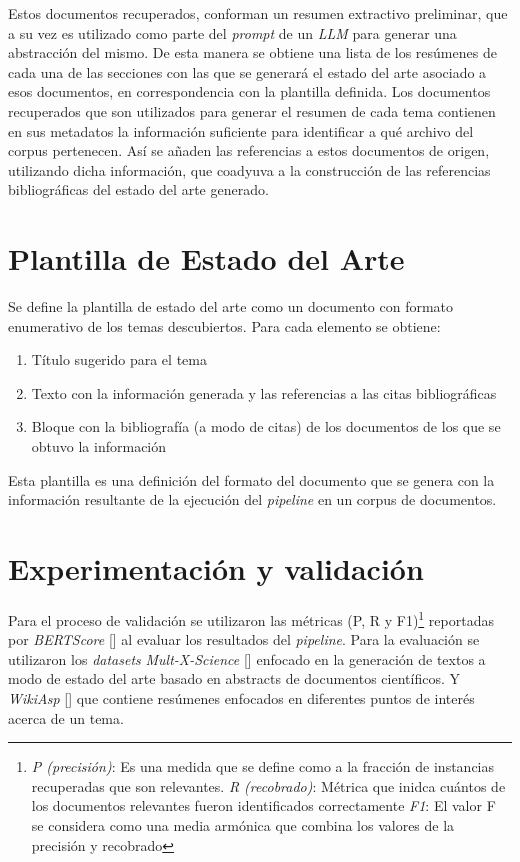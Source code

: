    Estos documentos recuperados, conforman un resumen extractivo preliminar, que a su vez es utilizado como parte del \emph{prompt} de un \emph{LLM} para generar una abstracción del mismo. De esta manera se obtiene una lista de los resúmenes de cada una de las secciones con las que se generará el estado del arte asociado a esos documentos, en correspondencia con la plantilla definida.
    Los documentos recuperados que son utilizados para generar el resumen de cada tema contienen en sus metadatos la información suficiente para identificar a qué archivo del corpus pertenecen. Así se añaden las referencias a estos documentos de origen, utilizando dicha información, que coadyuva a la construcción de las referencias bibliográficas del estado del arte generado.


\section{Plantilla de Estado del Arte}
Se define la plantilla de estado del arte como un documento con formato enumerativo de los temas descubiertos. Para cada elemento se obtiene:
\begin{enumerate}
    \item Título sugerido para el tema
    \item Texto con la información generada y las referencias a las citas bibliográficas
    \item Bloque con la bibliografía (a modo de citas) de los documentos de los que se obtuvo la información
\end{enumerate}

Esta plantilla es una definición del formato del documento que se genera con la información resultante de la ejecución del \emph{pipeline} en un corpus de documentos.

\section{Experimentación y validación}
Para el proceso de validación se utilizaron las m\'etricas (P, R y F1)\footnote{\emph{P (precisión)}: Es una medida que se define como a la fracción de instancias recuperadas que son relevantes. \emph{R (recobrado)}: M\'etrica que inidca cu\'antos de los documentos relevantes fueron identificados correctamente \emph{F1}: El valor F se considera como una media armónica que combina los valores de la precisión y recobrado} reportadas por \emph{BERTScore} [\cite{bertscore}] al evaluar los resultados del \emph{pipeline}.
Para la evaluación se utilizaron los \emph{datasets} \emph{Mult-X-Science} [\cite{multixscience}] enfocado en la generación de textos a modo de estado del arte basado en abstracts de documentos científicos. Y \emph{WikiAsp} [\cite{wikiasp}] que contiene resúmenes enfocados en diferentes puntos de interés acerca de un tema.

